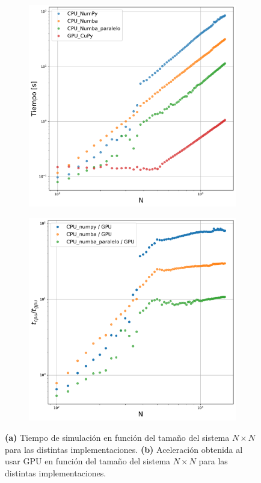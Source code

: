 \begin{figure}[h]
\begin{subfigure}{.5\textwidth}
  \centering
  \includegraphics[width=\textwidth]{cpu_gpu_t.pdf}
  \caption{}
\end{subfigure}
\begin{subfigure}{.5\textwidth}
  \centering
  \includegraphics[width=\textwidth]{cpu_gpu_ratio.pdf}
  \caption{}
\end{subfigure}
\caption{\textbf{(a)} Tiempo de simulación en función del tamaño del sistema $N \times N$ para las distintas implementaciones. \textbf{(b)} Aceleración 
obtenida al usar GPU en función del tamaño del sistema $N \times N$ para las distintas implementaciones.}
\end{figure}

